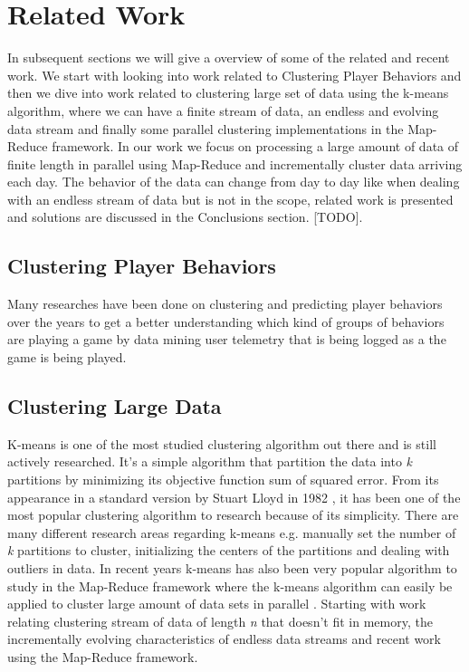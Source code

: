 
\chapter{Related Work} %
\label{Chapter3}

In subsequent sections we will give a overview of some of the related and recent work. We start with looking into work related to Clustering Player Behaviors and then we dive into  work related to clustering large set of data using the k-means algorithm, where we can have a finite stream of data, an endless and evolving data stream and finally some parallel clustering implementations in the Map-Reduce framework. In our work we focus on processing a large amount of data of finite length in parallel using Map-Reduce and incrementally cluster data arriving each day. The behavior of the data can change from day to day like when dealing with an endless stream of data but is not in the scope, related work is presented and solutions are discussed in the Conclusions section. [TODO].

\section{Clustering Player Behaviors}
Many researches have been done on clustering and predicting player behaviors over the years to get a better understanding which kind of groups of behaviors are playing a game by data mining user telemetry that is being logged as a the game is being played.

\section{Clustering Large Data}
K-means is one of the most studied clustering algorithm out there and is still actively researched. It's a simple algorithm that partition the data into \textit{k} partitions by minimizing its objective function sum of squared error. From its appearance in a standard version by Stuart Lloyd in 1982 \citep{Lloyd:1982} , it has been one of the most popular clustering algorithm to research because of its simplicity. There are many different research areas regarding k-means e.g. manually set the number of \textit{k} partitions to cluster, initializing the centers of the partitions and dealing with outliers in data. In recent years k-means has also been very popular algorithm to study in the Map-Reduce framework where the k-means algorithm can easily be applied to cluster large amount of data sets in parallel \citep{Dean:2004}. Starting with work relating clustering stream of data of length \textit{n} that doesn't fit in memory, the incrementally evolving characteristics of endless data streams and recent work using the Map-Reduce framework.

